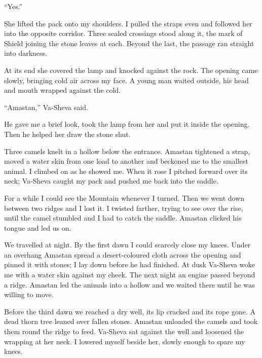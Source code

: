 ``Yes.''\par

She lifted the pack onto my shoulders. I pulled the straps even and followed her into the opposite corridor. Three sealed crossings stood along it, the mark of Shield joining the stone leaves at each. Beyond the last, the passage ran straight into darkness.\par

At its end she covered the lamp and knocked against the rock. The opening came slowly, bringing cold air across my face. A young man waited outside, his head and mouth wrapped against the cold.\par

``Amastan,'' Va-Sheva said.\par

He gave me a brief look, took the lamp from her and put it inside the opening. Then he helped her draw the stone shut.\par

\ornament

Three camels knelt in a hollow below the entrance. Amastan tightened a strap, moved a water skin from one load to another and beckoned me to the smallest animal. I climbed on as he showed me. When it rose I pitched forward over its neck; Va-Sheva caught my pack and pushed me back into the saddle.\par

For a while I could see the Mountain whenever I turned. Then we went down between two ridges and I lost it. I twisted farther, trying to see over the rise, until the camel stumbled and I had to catch the saddle. Amastan clicked his tongue and led us on.\par

We travelled at night. By the first dawn I could scarcely close my knees. Under an overhang Amastan spread a desert-coloured cloth across the opening and pinned it with stones; I lay down before he had finished. At dusk Va-Sheva woke me with a water skin against my cheek. The next night an engine passed beyond a ridge. Amastan led the animals into a hollow and we waited there until he was willing to move.\par

Before the third dawn we reached a dry well, its lip cracked and its rope gone. A dead thorn tree leaned over fallen stones. Amastan unloaded the camels and took them round the ridge to feed. Va-Sheva sat against the well and loosened the wrapping at her neck. I lowered myself beside her, slowly enough to spare my knees.\par

